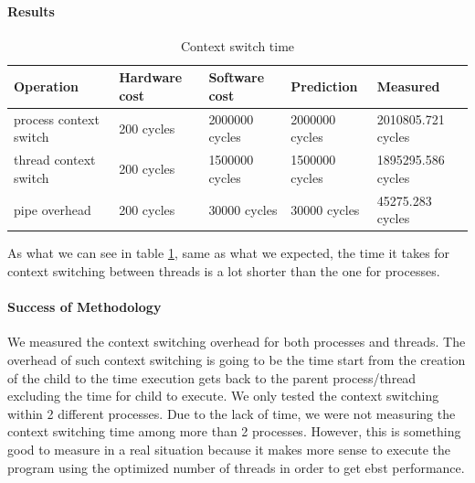 \paragraph{Results}
\begin{table}
\begin{center}
\begin{tabular}{| l | l | l | l | l |}
\hline

Operation 				& Hardware cost 	& Software cost 	& Prediction 	& Measured \\ \hline

process context switch 	& 200 cycles		&	2000000 cycles	&2000000 cycles	& 2010805.721 cycles \\
\hline
thread context switch 	& 200 cycles		&	1500000 cycles	&1500000 cycles	& 1895295.586 cycles \\ 
\hline
pipe overhead			& 200 cycles		&	30000 cycles	&30000 cycles	& 45275.283 cycles \\ 
\hline
\hline
\end{tabular}
\end{center}

\caption{Context switch time\label{tab:context-switch-time}}
\end{table}
As what we can see in table \ref{tab:context-switch-time}, same as what we expected, the time it takes for context switching between threads is a lot shorter than the one for processes.

\paragraph{Success of Methodology}
We measured the context switching overhead for both processes and threads. The overhead of such context switching is going to be the time start from the creation of the child to the time execution gets back to the parent process/thread excluding the time for child to execute. We only tested the context switching within 2 different processes. Due to the lack of time, we were not measuring the context switching time among more than 2 processes. However, this is something good to measure in a real situation because it makes more sense to execute the program using the optimized number of threads in order to get ebst performance.



